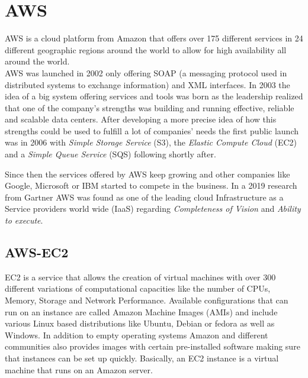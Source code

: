 \section{AWS}
AWS is a cloud platform from Amazon that offers over 175 different services in 24 different geographic regions around the world to allow for high availability all around the world. \cite{WhatIsAws}\\
AWS was launched in 2002 only offering SOAP (a messaging protocol used in distributed systems to exchange information) and XML interfaces. \cite{HistoryAwsMedia} In 2003 the idea of a big system offering services and tools was born as the leadership realized that one of the company's strengths was building and running effective, reliable and scalable data centers. After developing a more precise idea of how this strengths could be used to fulfill a lot of companies' needs the first public launch was in 2006 with \emph{Simple Storage Service} (S3), the \emph{Elastic Compute Cloud} (EC2) and a \emph{Simple Queue Service} (SQS) following shortly after. \cite{HistoryAwsTech}

Since then the services offered by AWS keep growing and other companies like Google, Microsoft or IBM started to compete in the business. In a 2019 research from Gartner AWS was found as one of the leading cloud Infrastructure as a Service providers world wide (IaaS) \cite{Gartner} 
regarding \emph{Completeness of Vision} and \emph{Ability to execute}. 

\subsection{AWS-EC2}
EC2 is a service that allows the creation of virtual machines with over 300 different variations of computational capacities like the number of CPUs, Memory, Storage and Network Performance. \cite{AwsEc2} 
Available configurations that can run on an instance are called Amazon Machine Images (AMIs) and include various Linux based distributions like Ubuntu, Debian or fedora as well as Windows. In addition to empty operating systems Amazon and different communities also provides images with certain pre-installed software making sure that instances can be set up quickly.
Basically, an EC2 instance is a virtual machine that runs on an Amazon server. \cite{Ec2VirtualMachine}


